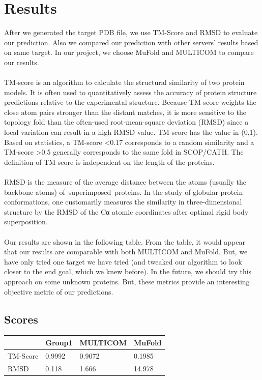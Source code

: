 \documentclass{article}
\begin{document}
\section{Results}

After we generated the target PDB file, we use TM-Score and RMSD to evaluate our prediction. Also we compared our prediction with other servers’ results based on same target. In our project, we choose MuFold and MULTICOM to compare our results.\\\\
TM-score is an algorithm to calculate the structural similarity of two protein models. It is often used to quantitatively assess the accuracy of protein structure predictions relative to the experimental structure. Because TM-score weights the close atom pairs stronger than the distant matches, it is more sensitive to the topology fold than the often-used root-mean-square deviation (RMSD) since a local variation can result in a high RMSD value. TM-score has the value in (0,1). Based on statistics, a TM-score \textless0.17 corresponds to a random similarity and a TM-score \textgreater0.5 generally corresponds to the same fold in SCOP/CATH. The definition of TM-score is independent on the length of the proteins.\\\\
RMSD is the measure of the average distance between the atoms (usually the backbone atoms) of superimposed proteins. In the study of globular protein conformations, one customarily measures the similarity in three-dimensional structure by the RMSD of the Cα atomic coordinates after optimal rigid body superposition.\\\\
Our results are shown in the following table. From the table, it would appear that our results are comparable with both MULTICOM and MuFold. But, we have only tried one target we have tried (and tweaked our algorithm to look closer to the end goal, which we knew before). In the future, we should try this approach on some unknown proteins.  But, these metrics provide an interesting objective metric of our predictions.

\subsection{Scores}
\begin{center}
    \begin{tabular}{ | l | l | l | p{2cm} |}
    \hline
      & Group1 & MULTICOM & MuFold \\ \hline
    TM-Score & 0.9992 & 0.9072 & 0.1985 \\ \hline
    RMSD & 0.118 & 1.666 & 14.978 \\
    \hline
    \end{tabular}
\end{center}
\end{document}
